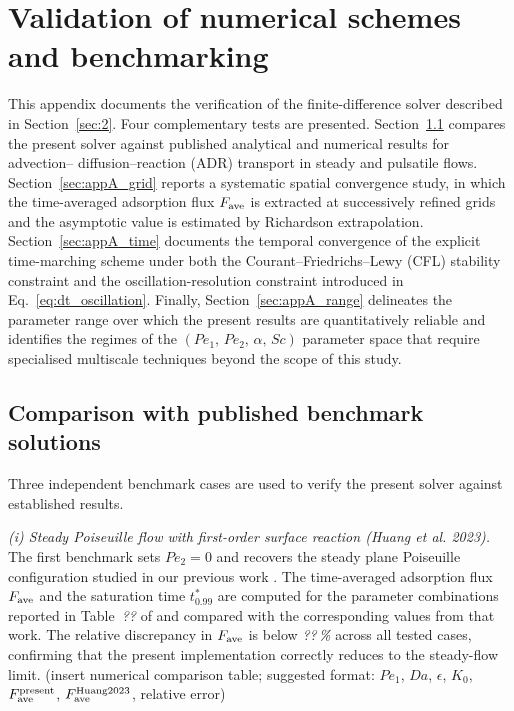 \documentclass[lineno]{JFM-FLM_Au}
\begin{document}
\appendix

\section{Validation of numerical schemes and benchmarking}
\label{appdix-A}
 
This appendix documents the verification of the finite-difference solver
described in Section~\ref{sec:2}. Four complementary tests are
presented. Section~\ref{sec:appA_benchmark} compares the present solver
against published analytical and numerical results for advection--
diffusion--reaction (ADR) transport in steady and pulsatile flows.
Section~\ref{sec:appA_grid} reports a systematic spatial convergence
study, in which the time-averaged adsorption flux $F_{\rm ave}$ is
extracted at successively refined grids and the asymptotic value is
estimated by Richardson extrapolation. Section~\ref{sec:appA_time}
documents the temporal convergence of the explicit time-marching scheme
under both the Courant--Friedrichs--Lewy (CFL) stability constraint and
the oscillation-resolution constraint introduced in
Eq.~\eqref{eq:dt_oscillation}. Finally, Section~\ref{sec:appA_range}
delineates the parameter range over which the present results are
quantitatively reliable and identifies the regimes of the
$(Pe_{1},\,Pe_{2},\,\alpha,\,Sc)$ parameter space that require
specialised multiscale techniques beyond the scope of this study.
 
\subsection{Comparison with published benchmark solutions}
\label{sec:appA_benchmark}
 
Three independent benchmark cases are used to verify the present solver
against established results.
 
\medskip
\noindent\textit{(i) Steady Poiseuille flow with first-order surface
reaction (Huang \textit{et al.} 2023).}
The first benchmark sets $Pe_{2} = 0$ and recovers the steady plane
Poiseuille configuration studied in our previous work
\citep{Huang2023}. The time-averaged adsorption flux $F_{\rm ave}$ and
the saturation time $t_{0.99}^{*}$ are computed for the parameter
combinations reported in Table~\textit{??} of \citep{Huang2023} and
compared with the corresponding values from that work. The relative
discrepancy in $F_{\rm ave}$ is below \textit{??\,\%} across all tested
cases, confirming that the present implementation correctly reduces to
the steady-flow limit. {\color{magenta}(insert numerical comparison
table; suggested format: $Pe_{1}$, $Da$, $\epsilon$, $K_{0}$,
$F_{\rm ave}^{\rm present}$, $F_{\rm ave}^{\rm Huang2023}$, relative
error)}
 
\end{document}
